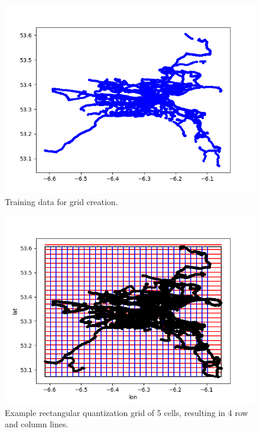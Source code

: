\documentclass[12pt]{article}
\begin{document}
	\begin{figure} [H]
		\begin{center}
			\includegraphics [scale = 0.70] {data_minmax_grid_extent.png}
			\caption{Training data for grid creation.}
		\end{center}
	\end{figure} 
	\begin{figure} [H]
		\begin{center}
			\includegraphics [scale = 0.70] {grid.png}
			\caption{Example rectangular quantization grid of 5 cells, resulting in 4
        row and column lines.}
		\end{center}
	\end{figure} 
\end{document}

